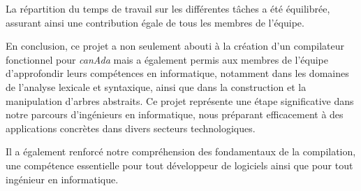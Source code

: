 \documentclass[french,a4paper]{article}
\begin{document}
    La répartition du temps de travail sur les différentes tâches a été équilibrée, assurant ainsi une contribution égale de tous les membres de l'équipe.

    En conclusion, ce projet a non seulement abouti à la création d'un compilateur fonctionnel pour \textit{canAda} mais a également permis aux membres de l'équipe d'approfondir leurs compétences en informatique, notamment dans les domaines de l'analyse lexicale et syntaxique, ainsi que dans la construction et la manipulation d'arbres abstraits.
    Ce projet représente une étape significative dans notre parcours d'ingénieurs en informatique, nous préparant efficacement à des applications concrètes dans divers secteurs technologiques.

    Il a également renforcé notre compréhension des fondamentaux de la compilation, une compétence essentielle pour tout développeur de logiciels ainsi que pour tout ingénieur en informatique.
\end{document}
